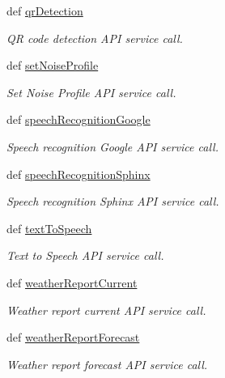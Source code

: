 \begin{DoxyCompactItemize}
def \hyperlink{classRappCloud_1_1RappPlatformApi_1_1RappPlatformAPI_a3a2ebc4083d98ffc218024e46c09a085}{qr\-Detection}
\begin{DoxyCompactList}\small\item\em Q\-R code detection A\-P\-I service call. \end{DoxyCompactList}\item 
def \hyperlink{classRappCloud_1_1RappPlatformApi_1_1RappPlatformAPI_a8d19a713799931f2f8b8a989fba6b1d5}{set\-Noise\-Profile}
\begin{DoxyCompactList}\small\item\em Set Noise Profile A\-P\-I service call. \end{DoxyCompactList}\item 
def \hyperlink{classRappCloud_1_1RappPlatformApi_1_1RappPlatformAPI_a9a15add1c6fff1045426e3c477ea95f3}{speech\-Recognition\-Google}
\begin{DoxyCompactList}\small\item\em Speech recognition Google A\-P\-I service call. \end{DoxyCompactList}\item 
def \hyperlink{classRappCloud_1_1RappPlatformApi_1_1RappPlatformAPI_a0115a47e3c40904c41d966a5f5b30037}{speech\-Recognition\-Sphinx}
\begin{DoxyCompactList}\small\item\em Speech recognition Sphinx A\-P\-I service call. \end{DoxyCompactList}\item 
def \hyperlink{classRappCloud_1_1RappPlatformApi_1_1RappPlatformAPI_a95b4b2033980408322378cea1cd2c2ef}{text\-To\-Speech}
\begin{DoxyCompactList}\small\item\em Text to Speech A\-P\-I service call. \end{DoxyCompactList}\item 
def \hyperlink{classRappCloud_1_1RappPlatformApi_1_1RappPlatformAPI_afe36b6ef3c96f1f116f9c3ff088b3421}{weather\-Report\-Current}
\begin{DoxyCompactList}\small\item\em Weather report current A\-P\-I service call. \end{DoxyCompactList}\item 
def \hyperlink{classRappCloud_1_1RappPlatformApi_1_1RappPlatformAPI_a3079b4312c6d35481c3c11eb56c233fd}{weather\-Report\-Forecast}
\begin{DoxyCompactList}\small\item\em Weather report forecast A\-P\-I service call. \end{DoxyCompactList}\end{DoxyCompactItemize}
